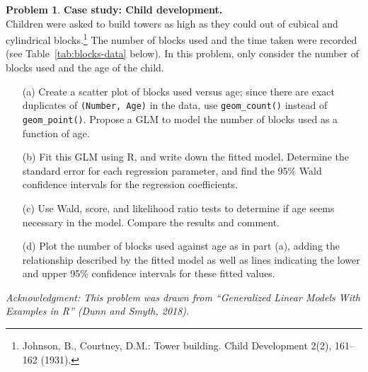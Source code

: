 \documentclass[11pt,letterpaper,english,oneside]{article} %
\theoremstyle{definition} %
\newtheorem{problem}{Problem}
\newenvironment{prob}{\clearpage \begin{problem}\hspace{0pt}}{\end{problem}}
\begin{document}
\begin{prob} \label{prob:blocks-data}\textbf{Case study: Child development.} \\

    \noindent Children were asked to build towers as high as they could out of cubical and cylindrical blocks.\footnote{Johnson, B., Courtney, D.M.: Tower building. Child Development 2(2), 161–162 (1931).} The number of blocks used and the time taken were recorded (see Table~\ref{tab:blocks-data} below). In this problem, only consider the number of blocks used and the age of the child.
    
    
    
    \begin{enumerate}
    
    \item[(a)] Create a scatter plot of blocks used versus age; since there are exact duplicates of \verb|(Number, Age)| in the data, use \verb|geom_count()| instead of \verb|geom_point()|. Propose a GLM to model the number of blocks used as a function of age.
    
    \item[(b)] Fit this GLM using R, and write down the fitted model. Determine the standard error for each regression parameter, and find the 95\% Wald confidence intervals for the regression coefficients.
    
    \item[(c)] Use Wald, score, and likelihood ratio tests to determine if age seems necessary in the model. Compare the results and comment.
    
    \item[(d)] Plot the number of blocks used against age as in part (a), adding the relationship described by the fitted model as well as lines indicating the lower and upper 95\% confidence intervals for these fitted values.
    
    \end{enumerate}
    
    \noindent \textit{Acknowledgment: This problem was drawn from ``Generalized Linear Models With Examples in R'' (Dunn and Smyth, 2018).}
    
    
\end{prob}
    
\end{document}
